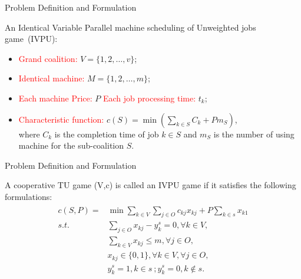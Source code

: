 \documentclass[14pt]{beamer}
\begin{document}
\begin{frame}{Problem Definition and Formulation}
	\begin{definition}\label{definition:IVPU}
	\small
	\justifying
	An Identical Variable Parallel machine scheduling of Unweighted jobs game~(IVPU):\\
	\begin{itemize}
	\pause
	\item \textcolor{red}{Grand coalition:} $V = \{1,2,\ldots,v\}$;
	\pause
	\item \textcolor{red}{Identical machine:} $M = \{1,2,\ldots,m\}$;
	\pause
	\item \textcolor{red}{Each machine Price:} $P$  \textcolor{red}{Each job processing time:} $t_k$;
	\pause
	\item \textcolor{red}{Characteristic function:} $c(S) = \min(\sum_{k\in S}C_k + Pm_S)$,\\
	\vspace{3mm}
	where $C_k$ is the completion time of job $k \in S$ and $m_S$ is the number of using machine for the sub-coalition $S$.
	\end{itemize}
	\end{definition}
\end{frame}

\begin{frame}{Problem Definition and Formulation}
	\begin{definition}\label{definition:IVPU}
	\small
	\justifying
	A cooperative TU game (V,c) is called an IVPU game if it satisfies the following formulations:\\
	\pause
	\vspace{-8mm}
	\begin{eqnarray*}\label{eqn:IVPU}
	\begin{aligned}
	c(S,P) = & {\min} \sum_{k\in V}\sum_{j\in O} {c_{kj} x_{kj}} + {P\sum_{k\in s} x_{k1}} \\
	{s.t.}\quad & \sum_{j \in O} x_{kj}-y_k^s=0, \forall k \in V, \\
	& \sum_{k\in V} x_{kj} \leq m,\forall j \in O,  \\
	& x_{kj} \in \{0,1\} , \forall k \in V, \forall j \in O,\\
	& y_k^s=1, k \in s~; y_k^s=0, k \notin s.
	\end{aligned}
	\end{eqnarray*}
	\end{definition}
\end{frame}
\end{document}
